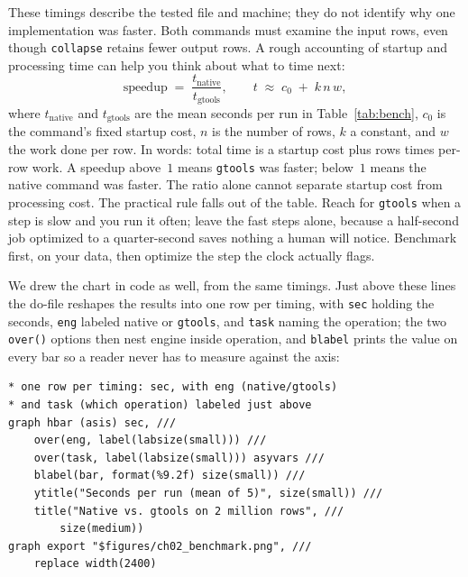 These timings describe the tested file and machine; they do not identify why one implementation was faster. Both commands must examine the input rows, even though \texttt{collapse} retains fewer output rows. A rough accounting of startup and processing time can help you think about what to time next:
\[
  \text{speedup} \;=\; \frac{t_{\text{native}}}{t_{\text{gtools}}},
  \qquad
  t \;\approx\; c_{0} \;+\; k\,n\,w,
\]
where $t_{\text{native}}$ and $t_{\text{gtools}}$ are the mean seconds per run in Table~\ref{tab:bench}, $c_{0}$ is the command's fixed startup cost, $n$ is the number of rows, $k$ a constant, and $w$ the work done per row. In words: total time is a startup cost plus rows times per-row work. A speedup above~$1$ means \texttt{gtools} was faster; below~$1$ means the native command was faster. The ratio alone cannot separate startup cost from processing cost. The practical rule falls out of the table. Reach for \texttt{gtools} when a step is slow and you run it often; leave the fast steps alone, because a half-second job optimized to a quarter-second saves nothing a human will notice. Benchmark first, on your data, then optimize the step the clock actually flags.

We drew the chart in code as well, from the same timings. Just above these lines the do-file reshapes the results into one row per timing, with \texttt{sec} holding the seconds, \texttt{eng} labeled native or \texttt{gtools}, and \texttt{task} naming the operation; the two \texttt{over()} options then nest engine inside operation, and \texttt{blabel} prints the value on every bar so a reader never has to measure against the axis:
\par
{\footnotesize
\begin{verbatim}
* one row per timing: sec, with eng (native/gtools)
* and task (which operation) labeled just above
graph hbar (asis) sec, ///
    over(eng, label(labsize(small))) ///
    over(task, label(labsize(small))) asyvars ///
    blabel(bar, format(%9.2f) size(small)) ///
    ytitle("Seconds per run (mean of 5)", size(small)) ///
    title("Native vs. gtools on 2 million rows", ///
        size(medium))
graph export "$figures/ch02_benchmark.png", ///
    replace width(2400)
\end{verbatim}
}

